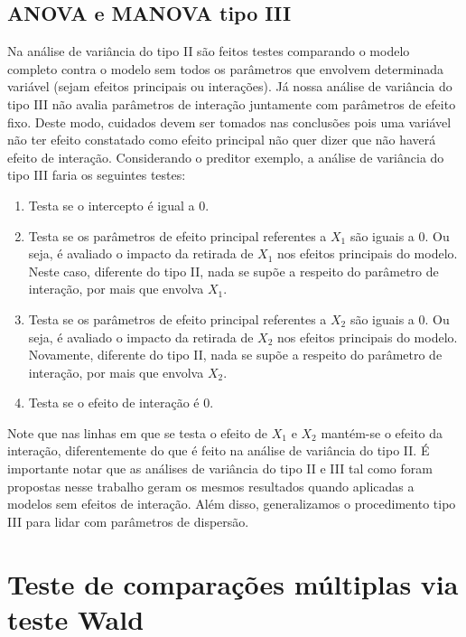 \subsection{ANOVA e MANOVA tipo III}

Na análise de variância do tipo II são feitos testes comparando o modelo completo contra o modelo sem todos os parâmetros que envolvem determinada variável (sejam efeitos principais ou interações). Já nossa análise de variância do tipo III não avalia parâmetros de interação juntamente com parâmetros de efeito fixo. Deste modo, cuidados devem ser tomados nas conclusões pois uma variável não ter efeito constatado como efeito principal não quer dizer que não haverá efeito de interação. Considerando o preditor exemplo, a análise de variância do tipo III faria os seguintes testes:

\begin{enumerate}
  \item Testa se o intercepto é igual a 0.
  
  \item Testa se os parâmetros de efeito principal referentes a $X_1$ são iguais a 0. Ou seja, é avaliado o impacto da retirada de $X_1$ nos efeitos principais do modelo. Neste caso, diferente do tipo II, nada se supõe a respeito do parâmetro de interação, por mais que envolva $X_1$.
  
  \item Testa se os parâmetros de efeito principal referentes a $X_2$ são iguais a 0. Ou seja, é avaliado o impacto da retirada de $X_2$ nos efeitos principais do modelo. Novamente, diferente do tipo II, nada se supõe a respeito do parâmetro de interação, por mais que envolva $X_2$.
  
  \item Testa se o efeito de interação é 0.
\end{enumerate}

Note que nas linhas em que se testa o efeito de $X_1$ e $X_2$ mantém-se o efeito da interação, diferentemente do que é feito na análise de variância do tipo II. É importante notar que as análises de variância do tipo II e III tal como foram propostas nesse trabalho geram os mesmos resultados quando aplicadas a modelos sem efeitos de interação. Além disso, generalizamos o procedimento tipo III para lidar com parâmetros de dispersão.


\section{Teste de comparações múltiplas via teste Wald}

